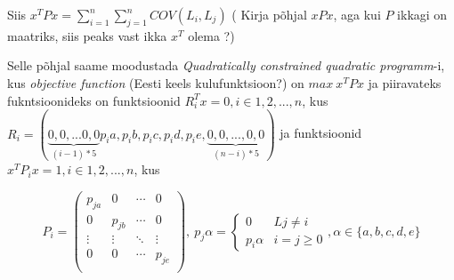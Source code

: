 \documentclass{article}
\begin{document}
Siis $x^TPx = \sum \limits_{i=1}^n \sum \limits_{j=1}^n COV(L_i,L_j)$ {\color{cyan} ( Kirja põhjal $ xPx $, aga kui $P$ ikkagi on maatriks, siis peaks vast ikka $x^T$ olema ?)}

Selle põhjal saame moodustada \textit{Quadratically constrained quadratic programm}-i, kus \textit{objective function} {\color{cyan} (Eesti keels kulufunktsioon?)} on $max ~ x^TPx$ ja piiravateks fukntsioonideks on funktsioonid $R_i^Tx = 0,  i \in {1,2,...,n}$, kus $R_i = (\underbrace{0,0,...0,0}_{(i-1)*5}p_ia,p_ib,p_ic,p_id,p_ie,\underbrace{0,0,...,0,0}_{(n-i)*5})$ ja funktsioonid $x^TP_ix = 1, i \in {1,2,...,n}$, kus 

\begin{equation*}
P_i =
\begin{pmatrix}
p_{ja}&0&\cdots &0 \\
0&p_{jb}&\cdots &0 \\
\vdots & \vdots & \ddots & \vdots \\
0&0&\cdots & p_{je} \\
\end{pmatrix}
,~p_j\alpha =
\begin{cases} 
0 & L j \neq i \\ 
p_i\alpha & i = j \geq 0 
\end{cases}
, \alpha \in \{a,b,c,d,e\}
\end{equation*}
\end{document}
